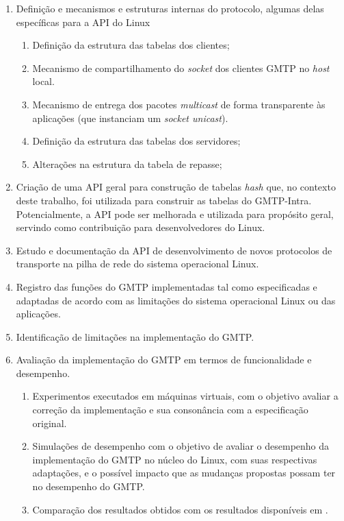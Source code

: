 \begin{enumerate}
	\item Definição e mecanismos e estruturas internas do protocolo, algumas delas específicas para a API do Linux
		\begin{enumerate}
			\item Definição da estrutura das tabelas dos clientes;
			\item Mecanismo de compartilhamento do \textit{socket} dos clientes GMTP no \textit{host} local.
			\item Mecanismo de entrega dos pacotes \textit{multicast} de forma transparente às aplicações (que instanciam um \textit{socket unicast}).
			\item Definição da estrutura das tabelas dos servidores;
			\item Alterações na estrutura da tabela de repasse;
		\end{enumerate}
		
	\item Criação de uma API geral para construção de tabelas \textit{hash} que, no contexto deste trabalho, foi utilizada para construir as tabelas do GMTP-Intra. 
	Potencialmente, a API pode ser melhorada e utilizada para propósito geral, servindo como contribuição para desenvolvedores do Linux.
	
	\item Estudo e documentação da API de desenvolvimento de novos protocolos de transporte na pilha de rede do sistema operacional Linux.

	\item Registro das funções do GMTP implementadas tal como especificadas e adaptadas de acordo com as limitações do sistema operacional Linux ou das aplicações.
	
	\item Identificação de limitações na implementação do GMTP.
	
	\item Avaliação da implementação do GMTP em termos de funcionalidade e desempenho.
	\begin{enumerate}
		\item Experimentos executados em máquinas virtuais, com o objetivo avaliar a correção da implementação e sua consonância com a especificação original.
			
		\item Simulações de desempenho com o objetivo de avaliar o desempenho da implementação do GMTP no núcleo do Linux, com suas respectivas adaptações, e o possível impacto que as mudanças propostas possam ter no desempenho do GMTP.
		
		\item Comparação dos resultados obtidos com os resultados disponíveis em \cite{sales2014gmtp}.
		\end{enumerate}
	
\end{enumerate}


